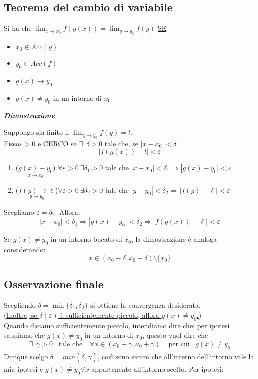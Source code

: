 \documentclass{article}
\theoremstyle{definition}
\begin{document}
\subsection{Teorema del cambio di variabile}
Si ha che $\lim_{x \to x_0}f(g(x))=\lim_{y \to y_0}f(y)$ \underline{SE} \begin{itemize}
    \item $x_0 \in Acc(g)$
    \item $y_0 \in Acc(f)$
    \item $g(x) \to y_0$
    \item $g(x) \neq y_0$ in un intorno di $x_0$
\end{itemize}
\begin{center}
    \textbf{\textit{Dimostrazione}}
\end{center}

    Suppongo sia finito il $\lim_{y \to y_0}f(y)=l$.
    \\
    Fisso$\varepsilon>0$ e CERCO se $\exists \,\,\, \overline{\delta} >0$ tale che, se $|x-x_0|<\overline{\delta}$
    \begin{equation}
        |f(g(x))-l|<\varepsilon
    \end{equation}
 \begin{enumerate}
\item ($\underset{x \to x_0}{g(x)-y_0}$) $\forall \varepsilon > 0\ \exists \delta_1 > 0$ tale che $|x - x_0| < \delta_1 \Rightarrow |g(x) - y_0| < \varepsilon$
\item ($\underset{y \to y_0}{f(y) \to \ell}$)$\forall \overline{\varepsilon} > 0\ \exists \delta_2 > 0$ tale che $|y - y_0| < \delta_2 \Rightarrow |f(y) - \ell| < \overline{\varepsilon}$
\end{enumerate}

Scegliamo $\overline{\varepsilon} = \delta_2$. Allora:
\[
|x - x_0| < \delta_1 \Rightarrow |g(x) - y_0| < \delta_2 \Rightarrow |f(g(x)) - \ell| < \varepsilon
\]

Se $g(x) \neq y_0$ in un intorno bucato di $x_0$, la dimostrazione è analoga considerando:
\[
x \in (x_0 - \delta, x_0 + \delta) \setminus \{x_0\}
\]

\subsection*{Osservazione finale}
Scegliendo $\delta = \min\{\delta_1, \delta_2\}$ si ottiene la convergenza desiderata.
    \\
   \underline{ (Inoltre, se $\tilde{\delta}(\varepsilon)$ è sufficientemente piccolo, allora $g(x) \neq y_0$.)}
   \\
   Quando diciamo \underline{sufficientemente piccolo}, intendiamo dire che: per ipotesi sappiamo che $g(x) \neq y_0$ in un intorno di $x_0$, questo vuol dire che
   \begin{equation}
       \exists \,\,\, \gamma > 0 \,\,\,\,\, \mbox{tale che} \,\,\,\,\,\ \forall x \in (x_0-\gamma, x_0+\gamma) \,\,\,\,\,\,\, \mbox{per cui} \,\,\,\,\, g(x) \neq y_0
   \end{equation}
   Dunque scelgo $\tilde{\tilde{\delta}}=min(\tilde{\delta},\gamma)$, così sono sicuro che all'interno dell'intorno vale la mia ipotesi e $g(x) \neq y_0 \forall x$ appartenente all'intorno scelto.
   Per ipotesi:
\end{document}
